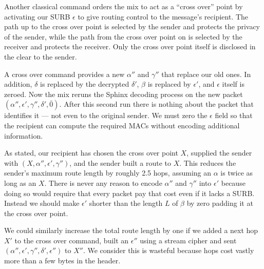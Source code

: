 \documentclass[twoside,letterpaper]{llncs}
\begin{document}
Another classical command orders the mix to act as a ``cross over''
point by activating our SURB $\epsilon$ to give routing control to
the message's recipient.  The path up to the cross over point
is selected by the sender and protects the privacy of the sender,
while the path from the cross over point on is selected by the
receiver and protects the receiver.  Only the cross over point
itself is disclosed in the clear to the sender.

A cross over command provides a new
$\alpha''$ and $\gamma''$ that replace our old ones.  
In addition, $\delta$ is replaced by the decrypted $\delta'$, 
$\beta$ is replaced by $\epsilon'$, and $\epsilon$ itself is zeroed.
Now the mix reruns the Sphinx decoding process on the new packet
$(\alpha'',\epsilon',\gamma'',\delta',\bar{0})$.  
After this second run there is nothing about the packet that 
identifies it --- not even to the original sender.
We must zero the $\epsilon$ field so that the recipient can compute
the required MACs without encoding additional information. 

As stated, our recipient has chosen the cross over point $X$,
supplied the sender with $(X,\alpha'',\epsilon',\gamma'')$,
and the sender built a route to $X$.  This reduces the sender's
maximum route length by roughly 2.5 hops, assuming an $\alpha$
is twice as long as an $X$.
There is never any reason to encode
$\alpha''$ and $\gamma''$ into $\epsilon'$ because doing so
would require that every packet pay that cost even if it lacks a SURB.
Instead we should make $\epsilon'$ shorter than the length $L$ of
$\beta$ by zero padding it at the cross over point.

We could similarly increase the total route length by one if
we added a next hop $X'$ to the cross over command, built an
$\epsilon''$ using a stream cipher and sent
 $(\alpha'',\epsilon',\gamma'',\delta',\epsilon'')$ to $X''$.
We consider this is wasteful because hops cost vastly more than
a few bytes in the header.
\end{document}
